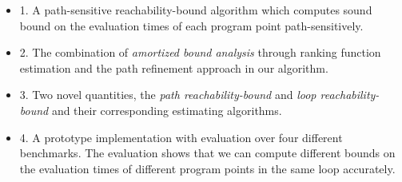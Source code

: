 \begin{itemize}
  \item 
1. A path-sensitive reachability-bound algorithm which computes sound bound on the evaluation times of each program point path-sensitively.
 \item 
2. The combination of \emph{amortized bound analysis} through ranking function estimation and the path refinement approach in our algorithm.
\item 
3. Two novel quantities, the \emph{path reachability-bound} and \emph{loop reachability-bound} and their corresponding estimating algorithms.
\item 
4. A prototype implementation with evaluation over four different benchmarks.
  The evaluation shows that we can compute different bounds on the evaluation times of different program points in the same loop accurately.
\end{itemize}